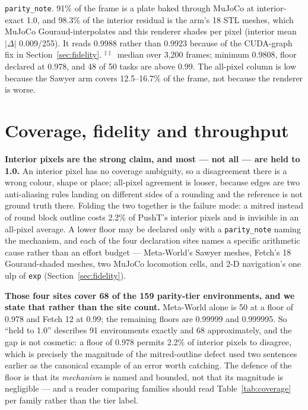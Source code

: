 \documentclass{article}
\begin{document}
\begin{table}[t]
{\texttt{parity\_note}. 91\% of the frame is a plate baked through MuJoCo at
interior-exact 1.0, and 98.3\% of the interior residual is the arm's 18 STL
meshes, which MuJoCo
Gouraud-interpolates and this renderer shades per pixel (interior mean
$|\Delta|$ 0.009/255). It reads 0.9988 rather than 0.9923 because of the
CUDA-graph fix in Section~\ref{sec:fidelity}. $^{\ddagger\ddagger}$~median over 3,200 frames;
minimum 0.9808, floor declared at 0.978, and 48 of 50 tasks are above 0.99. The all-pixel column is low because the Sawyer arm covers 12.5--16.7\%
of the frame, not because the renderer is worse.}
\end{table}

\section{Coverage, fidelity and throughput}
\label{sec:coverage}

\textbf{Interior pixels are the strong claim, and most --- not all --- are held to 1.0.} An
interior pixel has no coverage ambiguity, so a disagreement there is a wrong
colour, shape or place; all-pixel agreement is looser, because edges are two
anti-aliasing rules landing on different sides of a rounding and the reference
is not ground truth there. Folding the two together
is the failure mode: a mitred instead of round block outline costs 2.2\% of
PushT's interior pixels and is invisible in an all-pixel average. A lower floor
may be declared only with a \texttt{parity\_note} naming the mechanism, and
each of the four declaration sites names a specific arithmetic cause rather than
an effort budget --- Meta-World's Sawyer meshes, Fetch's 18 Gouraud-shaded
meshes, two MuJoCo locomotion cells, and 2-D navigation's one ulp of
\texttt{exp} (Section~\ref{sec:fidelity}).

\textbf{Those four sites cover 68 of the 159 parity-tier environments, and we
state that rather than the site count.} Meta-World alone is 50 at a floor of
0.978 and Fetch 12 at 0.99; the remaining floors are 0.99999 and 0.999995. So
``held to 1.0'' describes 91 environments exactly and 68 approximately, and the
gap is not cosmetic: a floor of 0.978 permits 2.2\% of interior pixels to
disagree, which is precisely the magnitude of the mitred-outline defect used
two sentences earlier as the canonical example of an error worth catching. The
defence of the floor is that its \emph{mechanism} is named and bounded, not
that its magnitude is negligible --- and a reader comparing families should
read Table~\ref{tab:coverage} per family rather than the tier label.
\end{document}
